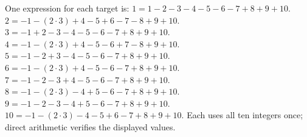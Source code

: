 One expression for each target is: $1=1-2-3-4-5-6-7+8+9+10$. $2=-1-(2\cdot3)+4-5+6-7-8+9+10$. $3=-1+2-3-4-5-6-7+8+9+10$. $4=-1-(2\cdot3)+4-5-6+7-8+9+10$. $5=-1-2+3-4-5-6-7+8+9+10$. $6=-1-(2\cdot3)+4-5-6-7+8+9+10$. $7=-1-2-3+4-5-6-7+8+9+10$. $8=-1-(2\cdot3)-4+5-6-7+8+9+10$. $9=-1-2-3-4+5-6-7+8+9+10$. $10=-1-(2\cdot3)-4-5+6-7+8+9+10$. Each uses all ten integers once; direct arithmetic verifies the displayed values.
